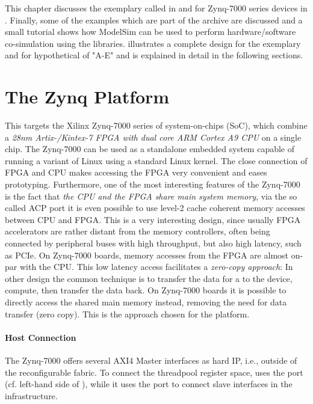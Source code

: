 This chapter discusses the exemplary  called  in  and  for Zynq-7000 series devices  in .
Finally, some of the examples which are part of the \tapasco{} archive are discussed and a small tutorial shows how ModelSim can be used to perform hardware/software co-simulation using the \tapasco{} libraries.
 illustrates a complete design for the exemplary  and  for hypothetical  of  "A-E" and is explained in detail in the following sections.

\section{The Zynq Platform}\label{sec:zynq-platform}
This  targets the Xilinx Zynq-7000 series of system-on-chips (SoC), which combine a \emph{28nm Artix-/Kintex-7 FPGA with dual core ARM Cortex A9 CPU} on a single chip.
The Zynq-7000 can be used as a standalone embedded system capable of running a variant of Linux using a standard Linux kernel.
The close connection of FPGA and CPU makes accessing the FPGA very convenient and eases prototyping.
Furthermore, one of the most interesting features of the Zynq-7000 is the fact that \emph{the CPU and the FPGA share main system memory}, via the so called ACP port it is even possible to use level-2 cache coherent memory accesses between CPU and FPGA.
This is a very interesting design, since usually FPGA accelerators are rather distant from the memory controllers, often being connected by peripheral buses with high throughput, but also high latency, such as PCIe.
On Zynq-7000 boards, memory accesses from the FPGA are almost on-par with the CPU.
This low latency access facilitates a \emph{zero-copy approach}:
In other design the common technique is to transfer the data for a  to the device, compute, then transfer the data back.
On Zynq-7000 boards it is possible to directly access the shared main memory instead, removing the need for data transfer (zero copy).
This is the approach chosen for the  platform.

\paragraph{Host Connection}
The Zynq-7000 offers several AXI4 Master interfaces as hard IP, i.e., outside of the reconfigurable fabric.
To connect the threadpool register space,  uses the  port (cf. left-hand side of ), while it uses the  port to connect slave interfaces in the  infrastructure.

